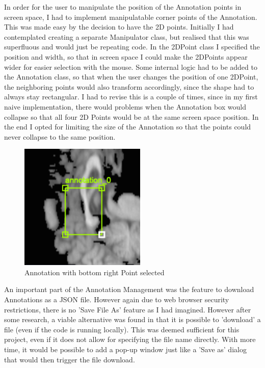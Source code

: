 \documentclass[a4paper,11pt,twoside]{article}
\begin{document}
In order for the user to manipulate the position of the Annotation points in screen space, I had to implement manipulatable corner points of the Annotation. This was made easy by the decision to have the 2D points. Initially I had contemplated creating a separate Manipulator class, but realised that this was superfluous and would just be repeating code. In the 2DPoint class I specified the position and width, so that in screen space I could make the 2DPoints appear wider for easier selection with the mouse. Some internal logic had to be added to the Annotation class, so that when the user changes the position of one 2DPoint, the neighboring points would also transform accordingly, since the shape had to always stay rectangular. I had to revise this is a couple of times, since in my first naive implementation, there would problems when the Annotation box would collapse so that all four 2D Points would be at the same screen space position. In the end I opted for limiting the size of the Annotation so that the points could never collapse to the same position.

\begin{figure}[ht!]
\centering
\includegraphics[width=60mm]{graphics/annoSelected_01.png}
\caption{Annotation with bottom right Point selected }
\label{fig:UIdesign1}
\end{figure}


An important part of the Annotation Management was the feature to download Annotations as a JSON file. However again due to web browser security restrictions, there is no 'Save File As' feature as I had imagined. However after some research, a viable alternative was found in that it is possible to 'download' a file (even if the code is running locally). This was deemed sufficient for this project, even if it does not allow for specifying the file name directly. With more time, it would be possible to add a pop-up window just like a 'Save as' dialog that would then trigger the file download.
\end{document}
